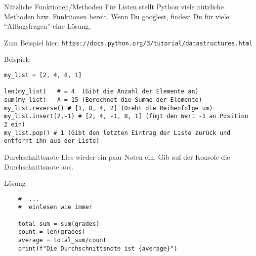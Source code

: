 \begin{fragile}
\begin{block}{Nützliche Funktionen/Methoden}
\vspace{2pt}	
Für Listen stellt Python viele nützliche Methoden bzw. Funktionen bereit. Wenn Du googlest, findest Du für viele \enquote{Alltagsfragen} eine Lösung. 

Zum Beispiel hier: \texttt{https://docs.python.org/3/tutorial/datastructures.html}
\end{block}

\pause
\vspace{12pt}


\begin{exampleblock}{Beispiele}
\begin{verbatim}
my_list = [2, 4, 8, 1]

len(my_list)   # = 4  (Gibt die Anzahl der Elemente an)
sum(my_list)   # = 15 (Berechnet die Summe der Elemente)
my_list.reverse() # [1, 8, 4, 2] (Dreht die Reihenfolge um)
my_list.insert(2,-1) # [2, 4, -1, 8, 1] (fügt den Wert -1 an Position 2 ein)
my_list.pop() # 1 (Gibt den letzten Eintrag der Liste zurück und entfernt ihn aus der Liste)
\end{verbatim}
\end{exampleblock}
\end{fragile}


\begin{fragile}[Übung]

\begin{block}{Durchschnittsnote}
\vspace{2pt}
Lies wieder ein paar Noten ein. Gib auf der Konsole die Durchschnittsnote aus. 
\end{block}	

\vspace{12pt}

\begin{solutionblock}{Lösung}
	\begin{verbatim}
	#  ...
	#  einlesen wie immer
	
	total_sum = sum(grades)
	count = len(grades)
	average = total_sum/count
	print(f"Die Durchschnittsnote ist {average}")
	\end{verbatim}
\end{solutionblock}
	
\end{fragile}

